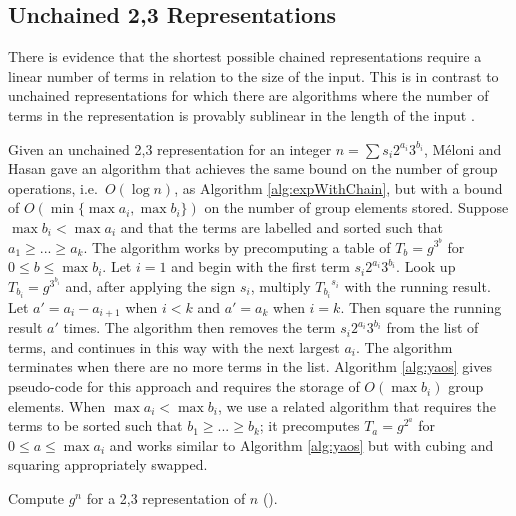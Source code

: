 \documentclass{ucalgthes1}
\theoremstyle{definition}
\newcommand{\algnewline}{\par\noindent\hskip\algorithmicindent}
\newcommand{\ZZgez}{\mathbb{Z}_{\ge 0}}
\begin{document}
\subsection{Unchained 2,3 Representations}
\label{subsec:dbnsReps}

There is evidence \cite{Imbert2010} that the shortest possible chained representations require a linear number of terms in relation to the size of the input.  This is in contrast to unchained representations for which there are algorithms where the number of terms in the representation is provably sublinear in the length of the input \cite{Dimitrov2008, Ciet2005}.

Given an unchained 2,3 representation for an integer $n = \sum s_i 2^{a_i} 3^{b_i}$, M\'{e}loni and Hasan \cite[Section 3.2]{Meloni2009} gave an algorithm that achieves the same bound on the number of group operations, i.e.\ $O(\log n)$, as Algorithm \ref{alg:expWithChain}, but with a bound of $O(\min \{\max a_i, \max b_i\})$ on the number of group elements stored.  Suppose $\max b_i < \max a_i$ and that the terms are labelled and sorted such that $a_1 \ge ... \ge a_k$.  The algorithm works by precomputing a table of $T_b = g^{3^b}$ for $0 \le b \le \max b_i$.  Let $i=1$ and begin with the first term $s_i2^{a_i}3^{b_i}$.  Look up $T_{b_i} = g^{3^{b_i}}$ and, after applying the sign $s_i$, multiply ${T_{b_i}}^{s_i}$ with the running result.  Let $a' = a_i - a_{i+1}$ when $i < k$ and $a' = a_k$ when $i = k$.  Then square the running result $a'$ times.  The algorithm then removes the term $s_i2^{a_i}3^{b_i}$ from the list of terms, and continues in this way with the next largest $a_i$.  The algorithm terminates when there are no more terms in the list.  Algorithm  \ref{alg:yaos} gives pseudo-code for this approach and requires the storage of $O(\max b_i)$ group elements.  When $\max a_i < \max b_i$, we use a related algorithm that requires the terms to be sorted such that $b_1 \ge ... \ge b_k$; it precomputes $T_a = g^{2^a}$ for $0 \le a \le \max a_i$ and works similar to Algorithm \ref{alg:yaos} but with cubing and squaring appropriately swapped.

\begin{algorithm}[htb]
\caption{Compute $g^n$ for a 2,3 representation of $n$ (\cite[Section 3.2]{Meloni2009}).}
\label{alg:yaos}
\end{algorithm}
\end{document}
